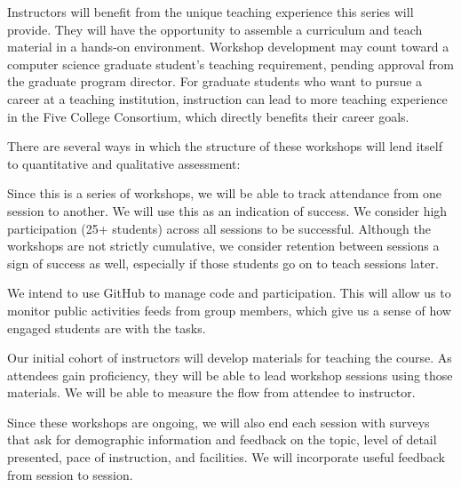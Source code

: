 \documentclass{article}
\begin{document}
Instructors will benefit from the unique teaching experience this series will provide. They will have the opportunity to assemble a curriculum and teach material in a hands-on environment. Workshop development may count toward a computer science graduate student’s teaching requirement, pending approval from the graduate program director. For graduate students who want to pursue a career at a teaching institution, instruction can lead to more teaching experience in the Five College Consortium, which directly benefits their career goals.


There are several ways in which the structure of these workshops will lend itself to quantitative and qualitative assessment:

Since this is a series of workshops, we will be able to track attendance from one session to another. We will use this as an indication of success. We consider high participation (25+ students) across all sessions to be successful. Although the workshops are not strictly cumulative, we consider retention between sessions a sign of success as well, especially if those students go on to teach sessions later.

We intend to use GitHub to manage code and participation. This will allow us to monitor public activities feeds from group members, which give us a sense of how engaged students are with the tasks.

Our initial cohort of instructors will develop materials for teaching the course. As attendees gain proficiency, they will be able to lead workshop sessions using those materials. We will be able to measure the flow from attendee to instructor.

Since these workshops are ongoing, we will also end each session with surveys that ask for demographic information and feedback on the topic, level of detail presented, pace of instruction, and facilities. We will incorporate useful feedback from session to session.
\end{document}

